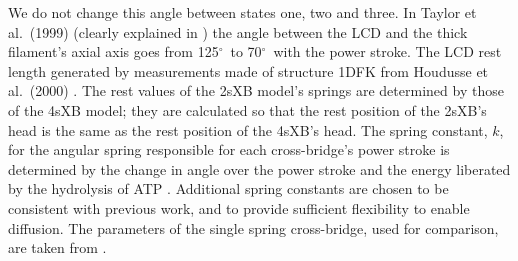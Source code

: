 \documentclass[10pt]{article}
\newcommand{\citep}[1]{\cite{#1}} %
\newcommand{\de}{$^\circ$} %
\begin{document}
\begin{table}[ht]
\begin{center}
{	    We do not change this angle between states one, two and three.
	    In Taylor et al.~(1999) \citep{Taylor1999} (clearly explained in \citep{Davis2009}) the angle between the LCD and the thick filament's axial axis goes from 125\de~to 70\de~with the power stroke. 
	    The LCD rest length generated by measurements made of structure 1DFK from Houdusse et al.~(2000) \citep{Houdusse2000}. 
	    The rest values of the 2sXB model's springs are determined by those of the 4sXB model; they are calculated so that the rest position of the 2sXB's head is the same as the rest position of the 4sXB's head. 
	    The spring constant, $k$, for the angular spring responsible for each cross-bridge's power stroke is determined by the change in angle over the power stroke and the energy liberated by the hydrolysis of ATP \citep{Tanner2007}. 
	    Additional spring constants are chosen to be consistent with previous work, and to provide sufficient flexibility to enable diffusion. 
        The parameters of the single spring cross-bridge, used for comparison, are taken from \citep{Tanner2007}.
    }
    \end{center}
\end{table}

\end{document}
